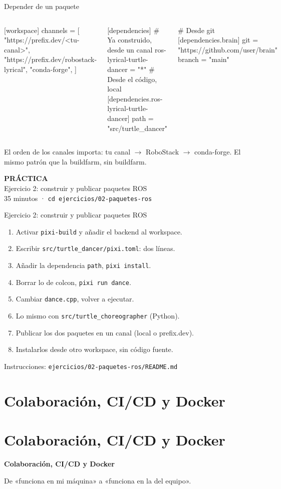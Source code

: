 \documentclass[aspectratio=169]{beamer}
\newcommand{\practicaframe}[2]{%
\begin{frame}
  \centering
  \vfill
  {\Large \textbf{PRÁCTICA}}\\[1em]
  {\large #1}\\[0.5em]
  {\color{halfgray} #2}
  \vfill
\end{frame}%
}
\newcommand{\separador}[2]{%
\begin{frame}
  \centering
  \vfill
  {\usebeamercolor[fg]{structure}\fontsize{34}{40}\selectfont\bfseries #1\par}
  \vspace{1.2em}
  {\Large\color{halfgray} #2\par}
  \vfill
\end{frame}%
}
\newcommand{\seccion}[3][]{%
  \if\relax\detokenize{#1}\relax\section{#2}\else\section[#1]{#2}\fi
  \separador{#2}{#3}%
}
\begin{document}
\begin{frame}[fragile]{Depender de un paquete}
\begin{columns}[T]
[workspace]
channels = [
  "https://prefix.dev/<tu-canal>",
  "https://prefix.dev/robostack-lyrical",
  "conda-forge",
]

[dependencies]
# Ya construido, desde un canal
ros-lyrical-turtle-dancer = "*"
# Desde el código, local
[dependencies.ros-lyrical-turtle-dancer]
path = "src/turtle_dancer"

# Desde git
[dependencies.brain]
git = "https://github.com/user/brain"
branch = "main"
\end{columns}
\vfill
\small El orden de los canales importa: tu canal $\rightarrow$ RoboStack $\rightarrow$ conda-forge. El mismo patrón que la buildfarm, sin buildfarm.
\end{frame}

\practicaframe{Ejercicio 2: construir y publicar paquetes ROS}{35 minutos · \texttt{cd ejercicios/02-paquetes-ros}}

\begin{frame}{Ejercicio 2: construir y publicar paquetes ROS}
\begin{enumerate}
    \item Activar \texttt{pixi-build} y añadir el backend al workspace.
    \item Escribir \lstinline|src/turtle_dancer/pixi.toml|: dos líneas.
    \item Añadir la dependencia \texttt{path}, \lstinline|pixi install|.
    \item Borrar lo de colcon, \lstinline|pixi run dance|.
    \item Cambiar \texttt{dance.cpp}, volver a ejecutar.
    \item Lo mismo con \lstinline|src/turtle_choreographer| (Python).
    \item Publicar los dos paquetes en un canal (local o prefix.dev).
    \item Instalarlos desde otro workspace, sin código fuente.
\end{enumerate}
\vfill
\small Instrucciones: \texttt{ejercicios/02-paquetes-ros/README.md}
\end{frame}

\seccion[Colaboración]{Colaboración, CI/CD y Docker}{De «funciona en mi máquina» a «funciona en la del equipo».}
\end{document}
